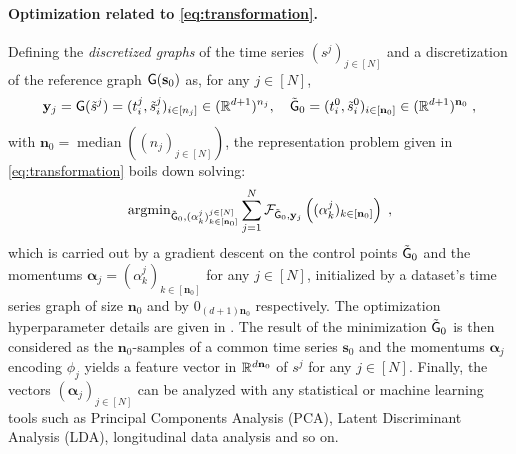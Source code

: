      \paragraph{Optimization related to \eqref{eq:transformation}.}
     Defining the \textit{discretized graphs} of the time series $(s^j)_{j\in[N]}$ and a discretization of the reference graph $\mathsf{G}(\mathbf{s}_0)$  as, for any $j\in[N]$,
     \begin{equation}
      \label{eq:descretized_graph}
      \mathbf{y}_j=\mathsf{G}(\tilde{s}^j)=(t_i^j,\tilde{s}^j_i)_{ i\in[n_j]}\in (\mathbb{R}^{d+1})^{n_j},\quad \tilde{\mathsf{G}}_0=(t_i^0,\tilde{s}^0_i)_{i\in[\mathbf{n}_0]}\in (\mathbb{R}^{d+1})^{\mathbf{n}_0} \; ,
     \end{equation}
       with $\mathbf{n}_0=\operatorname{median}((n_j)_{j\in[N]})$, the representation problem given in \eqref{eq:transformation} boils down solving:
      \begin{equation}
        \label{eq:general_optimization_problem}
        \operatorname{argmin}_{\tilde{\mathsf{G}}_0,(\alpha_k^j)_{k\in [\mathbf{n}_0]}^{j\in[N]}} \sum_{j=1}^N \mathcal{F}_{\tilde{\mathsf{G}}_0,\mathbf{y}_j}\left((\alpha_k^j)_{k\in [\mathbf{n}_0]}\right)\; ,
      \end{equation}
      which is carried out by a gradient descent on the control points $\tilde{\mathsf{G}}_0$ and the momentums $\mathbf{\alpha}_j=(\alpha_k^j)_{k\in [\mathbf{n}_0]}$ for any $j\in[N]$, initialized by a dataset's time series graph of size $\mathbf{n}_0$ and by $0_{(d+1)\mathbf{n}_0}$ respectively.
      The optimization hyperparameter details are given in .
     The result of the minimization $\tilde{\mathsf{G}}_0$ is then considered as the $\mathbf{n}_0$-samples of a common time series $\mathbf{s}_0$ and the momentums $\mathbf{\alpha}_j$ encoding $\phi_j$ yields a feature vector in $\mathbb{R}^{d \mathbf{n}_0} $ of $s^j$ for any $j\in[N]$.
     Finally, the vectors $(\mathbf{\alpha}_j)_{j\in[N]}$ can be analyzed with any statistical or machine learning tools such as Principal Components Analysis (PCA), Latent Discriminant Analysis (LDA), longitudinal data analysis and so on.

